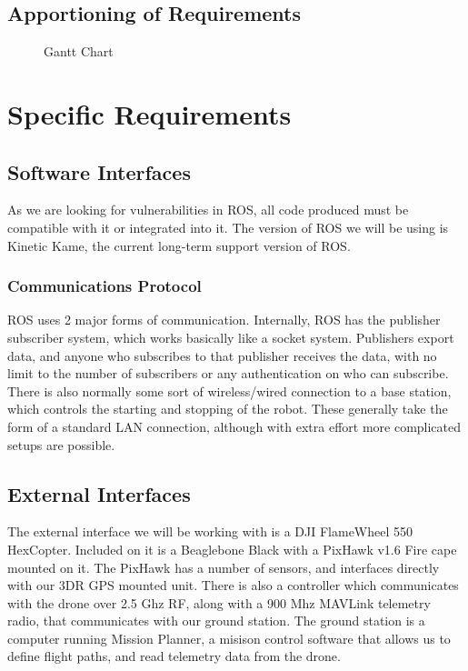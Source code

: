 \documentclass{scrreprt}
\begin{document}
\section{Apportioning of Requirements}
  \begin{center}
    \begin{figure}
      \caption{Gantt Chart}
      \label{fig:gantt}
    \end{figure}
  \end{center}

\chapter{Specific Requirements}

\section{Software Interfaces}
As we are looking for vulnerabilities in ROS, all code produced must be compatible with it or integrated into it. The version of ROS we will be using is Kinetic Kame, the current long-term support version of ROS.

\subsection{Communications Protocol}
ROS uses 2 major forms of communication. Internally, ROS has the publisher subscriber system, which works basically like a socket system.
Publishers export data, and anyone who subscribes to that publisher receives the data, with no limit to the number of
subscribers or any authentication on who can subscribe. There is also normally some sort of wireless/wired connection to a base
station, which controls the starting and stopping of the robot. These generally take the form of a standard LAN connection,
although with extra effort more complicated setups are possible.

\section{External Interfaces}
The external interface we will be working with is a DJI FlameWheel 550 HexCopter.
Included on it is a Beaglebone Black with a PixHawk v1.6 Fire cape mounted on it.
The PixHawk has a number of sensors, and interfaces directly with our 3DR GPS mounted unit. There is also
a controller which communicates with the drone over 2.5 Ghz RF, along with a 900 Mhz MAVLink telemetry
radio, that communicates with our ground station. The ground station is a computer running Mission Planner,
a misison control software that allows us to define flight paths, and read telemetry data from the drone.
\end{document}

